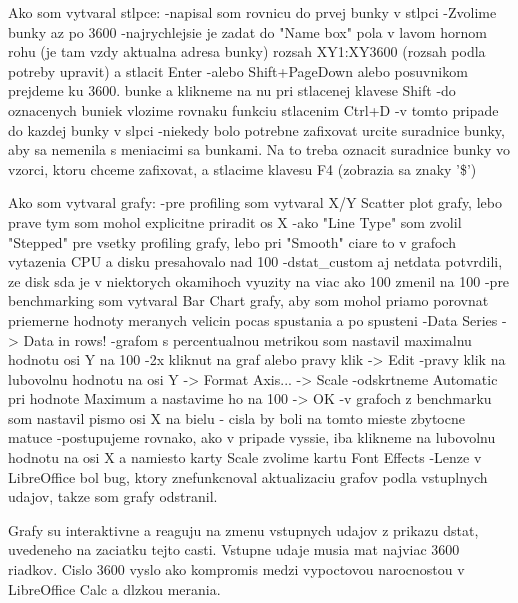 Ako som vytvaral stlpce:
  -napisal som rovnicu do prvej bunky v stlpci
  -Zvolime bunky az po 3600
    -najrychlejsie je zadat do "Name box" pola v lavom hornom rohu (je tam vzdy
    aktualna adresa bunky) rozsah XY1:XY3600 (rozsah podla potreby upravit) a
    stlacit Enter
    -alebo Shift+PageDown alebo posuvnikom prejdeme ku 3600. bunke
    a klikneme na nu pri stlacenej klavese Shift
  -do oznacenych buniek vlozime rovnaku funkciu stlacenim Ctrl+D
    -v tomto pripade do kazdej bunky v slpci
  -niekedy bolo potrebne zafixovat urcite suradnice bunky, aby sa nemenila s 
    meniacimi sa bunkami. Na to treba oznacit suradnice bunky vo vzorci, ktoru 
    chceme zafixovat, a stlacime klavesu F4 (zobrazia sa znaky '\$')

Ako som vytvaral grafy:
  -pre profiling som vytvaral X/Y Scatter plot grafy, lebo prave tym som mohol 
  explicitne priradit os X
    -ako "Line Type" som zvolil "Stepped" pre vsetky profiling grafy, 
      lebo pri "Smooth" ciare to v grafoch vytazenia CPU a disku presahovalo 
      nad 100%
    -dstat\_custom aj netdata potvrdili, ze disk sda je v niektorych okamihoch
      vyuzity na viac ako 100%
      zmenil na 100
  -pre benchmarking som vytvaral Bar Chart grafy, aby som mohol priamo porovnat
    priemerne hodnoty meranych velicin pocas spustania a po spusteni
  -Data Series -> Data in rows!
  -grafom s percentualnou metrikou som nastavil maximalnu hodnotu osi Y na 100
    -2x kliknut na graf alebo pravy klik -> Edit
    -pravy klik na lubovolnu hodnotu na osi Y -> Format Axis... -> Scale
    -odskrtneme Automatic pri hodnote Maximum a nastavime ho na 100 -> OK
  -v grafoch z benchmarku som nastavil pismo osi X na bielu - cisla by boli na 
  tomto mieste zbytocne matuce
    -postupujeme rovnako, ako v pripade vyssie, iba klikneme na lubovolnu hodnotu
    na osi X a namiesto karty Scale zvolime kartu Font Effects
  -Lenze v LibreOffice bol bug, ktory znefunkcnoval aktualizaciu grafov podla
   vstuplnych udajov, takze som grafy odstranil.

Grafy su interaktivne a reaguju na zmenu vstupnych udajov z prikazu dstat, uvedeneho
na zaciatku tejto casti. Vstupne udaje musia mat najviac 3600 riadkov. Cislo 3600
vyslo ako kompromis medzi vypoctovou narocnostou v LibreOffice Calc a dlzkou merania.

